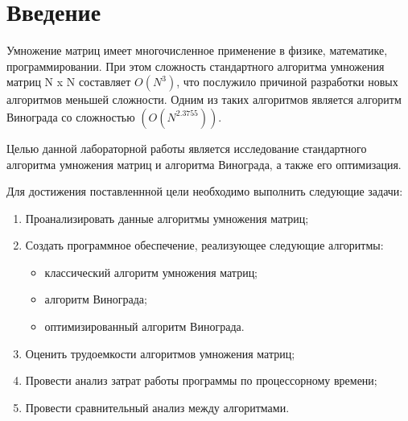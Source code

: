 \chapter*{Введение}

Умножение матриц имеет многочисленное применение в физике,
математике, программировании. При этом сложность стандартного алгоритма умножения матриц
N x N составляет $O(N^3)$, что послужило причиной разработки новых алгоритмов меньшей сложности. 
Одним из таких алгоритмов является алгоритм Винограда со сложностью $(O(N^{2.3755}))$.

Целью данной лабораторной работы является исследование стандартного алгоритма умножения матриц и 
алгоритма Винограда, а также его оптимизация.

Для достижения поставленнной цели необходимо выполнить следующие задачи:

\begin{enumerate}[label={\arabic*)}]
	\item Проанализировать данные алгоритмы умножения матриц;
	\item Создать программное обеспечение, реализующее следующие алгоритмы:
	\begin{itemize}[label=---]
		\item классический алгоритм умножения матриц;
		\item алгоритм Винограда;
		\item оптимизированный алгоритм Винограда.
	\end{itemize}
	\item Оценить трудоемкости алгоритмов умножения матриц;
	\item Провести анализ затрат работы программы по процессорному времени;
	\item Провести сравнительный анализ между алгоритмами.
\end{enumerate}
